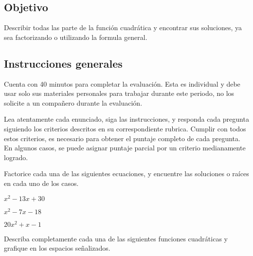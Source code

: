 \documentclass[]{srs}
\begin{document}
\subsection*{Objetivo}
  Describir todas las parte de la función cuadrática y encontrar sus soluciones, ya sea
  factorizando o utilizando la formula general.

\subsection*{Instrucciones generales}
  Cuenta con 40 minutos para completar la evaluación. Esta es individual y debe usar solo
  sus materiales personales para trabajar durante este periodo, no los solicite a un compañero
  durante la evaluación.

  Lea atentamente cada enunciado, siga las instrucciones, y responda cada
  pregunta siguiendo los criterios descritos en su correspondiente rubrica. Cumplir
  con todos estos criterios, es necesario para obtener el puntaje completo de cada pregunta.
  En algunos casos, se puede asignar puntaje parcial por un criterio medianamente logrado.

\separador[2mm]

Factorice cada una de las siguientes ecuaciones, y encuentre las soluciones o raíces
en cada uno de los casos.

\begin{preguntas}
  \pregunta $x^2 -13x+30$
  \begin{malla}[7]

  \end{malla}
  \usebox{\rubricaUno}
  \pregunta $x^2-7x-18$
  \begin{malla}[7]

  \end{malla}
  \usebox{\rubricaUno}
  \pregunta $20x^2+x-1$
  \begin{malla}[7]

  \end{malla}
  \usebox{\rubricaUno}

\end{preguntas}

\newpage
Describa completamente cada una de las siguientes funciones cuadráticas y grafique
en los espacios señalizados.
\end{document}
